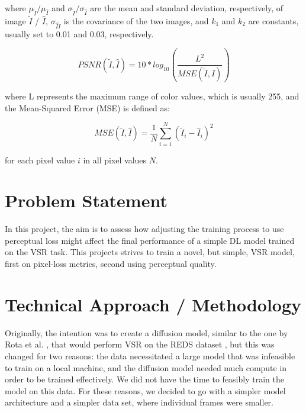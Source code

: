 \documentclass{article}
\begin{document}
where \(\mu_{\widetilde{I}} / \mu_{\hat{I}}\) and \(\sigma_{\widetilde{I}} / \sigma_{\hat{I}}\) are the mean and standard deviation, respectively, of image \(\widetilde{I}\) / \(\hat{I}\), \(\sigma_{\hat{I} \widetilde{I}}\) is the covariance of the two images, and \(k_1\) and \(k_2\) are constants, usually set to 0.01 and 0.03, respectively.

\begin{equation}
    PSNR(\widetilde{I}, \hat{I}) = 10*log_{10} \left( \frac{L^2}{MSE ( \widetilde{I}, \hat{I} )} \right)
\end{equation} 

where L represents the maximum range of color values, which is usually 255, and the Mean-Squared Error (MSE) is defined as: 

\begin{equation}
    MSE(\widetilde{I}, \hat{I}) = \frac{1}{N} \sum^{N}_{i=1} (\widetilde{I}_i - \hat{I}_i)^2
\end{equation} 

for each pixel value \(i\) in all pixel values \(N\). 

\section{Problem Statement}

In this project, the aim is to assess how adjusting the training process to use perceptual loss might affect the final performance of a simple DL model trained on the VSR task. This projects strives to train a novel, but simple, VSR model, first on pixel-loss metrics, second using perceptual quality.  

\section{Technical Approach / Methodology}

Originally, the intention was to create a diffusion model, similar to the one by Rota et al. \cite{rota_enhancing_2023}, that would perform VSR on the REDS dataset \cite{nah_ntire_2021}, but this was changed for two reasons: the data necessitated a large model that was infeasible to train on a local machine, and the diffusion model needed much compute in order to be trained effectively. We did not have the time to feasibly train the model on this data. For these reasons, we decided to go with a simpler model architecture and a simpler data set, where individual frames were smaller.
\end{document}
